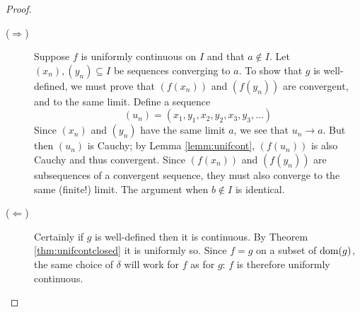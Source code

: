 \begin{proof}
\begin{description}
\item[\normalfont ($\Rightarrow$)] Suppose $f$ is uniformly continuous on $I$ and that $a\not\in I$. Let $(x_n),(y_n)\subseteq I$ be sequences converging to $a$. To show that $g$ is well-defined, we must prove that $(f(x_n))$ and $(f(y_n))$ are convergent, and to the same limit.\smallbreak
Define a sequence
\[(u_n)=(x_1,y_1,x_2,y_2,x_3,y_3,\ldots)\]
Since $(x_n)$ and $(y_n)$ have the same limit $a$, we see that $u_n\to a$. But then $(u_n)$ is Cauchy; by Lemma \ref{lemm:unifcont}, $(f(u_n))$ is also Cauchy and thus convergent. Since $(f(x_n))$ and $(f(y_n))$ are subsequences of a convergent sequence, they must also converge to the same (finite!) limit.\smallbreak
The argument when $b\not\in I$ is identical.
\item[\normalfont ($\Leftarrow$)] Certainly if $g$ is well-defined then it is continuous. By Theorem \ref{thm:unifcontclosed} it is uniformly so. Since $f=g$ on a subset of $\operatorname{dom}(g)$, the same choice of $\delta$ will work for $f$ as for $g$: $f$ is therefore uniformly continuous.\qedhere
\end{description}
\end{proof}




